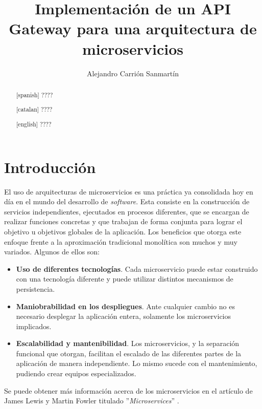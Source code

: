 \documentclass[11pt,spanish,listoffigures]{tfgetsinf}
\title{Implementación de un API Gateway para una arquitectura de microservicios}
\author{Alejandro Carrión Sanmartín}
\begin{document}

\begin{abstract}[spanish]
????
\end{abstract}
\begin{abstract}[catalan]
????
\end{abstract}
\begin{abstract}[english]
????
\end{abstract}

\mainmatter


\chapter{Introducción}

El uso de arquitecturas de microservicios es una práctica ya consolidada hoy en día en el mundo del desarrollo de \emph{software}. Esta consiste en la construcción de servicios independientes, ejecutados en procesos diferentes, que se encargan de realizar funciones concretas y que trabajan de forma conjunta para lograr el objetivo u objetivos globales de la aplicación. Los beneficios que otorga este enfoque frente a la aproximación tradicional monolítica son muchos y muy variados. Algunos de ellos son:

\begin{itemize}

	\item \textbf{Uso de diferentes tecnologías}.
Cada microservicio puede estar construido con una tecnología diferente y puede utilizar distintos mecanismos de persistencia.

	\item \textbf{Maniobrabilidad en los despliegues}.
Ante cualquier cambio no es necesario desplegar la aplicación entera, solamente los microservicios implicados.

	\item \textbf{Escalabilidad y mantenibilidad}.
Los microservicios, y la separación funcional que otorgan, facilitan el escalado de las diferentes partes de la aplicación de manera independiente. Lo mismo sucede con el mantenimiento, pudiendo crear equipos especializados.

\end{itemize}

Se puede obtener más información acerca de los microservicios en el artículo de James Lewis y Martin Fowler titulado ''\emph{Microservices}'' \cite{LewisAndFowler}.
\end{document}
